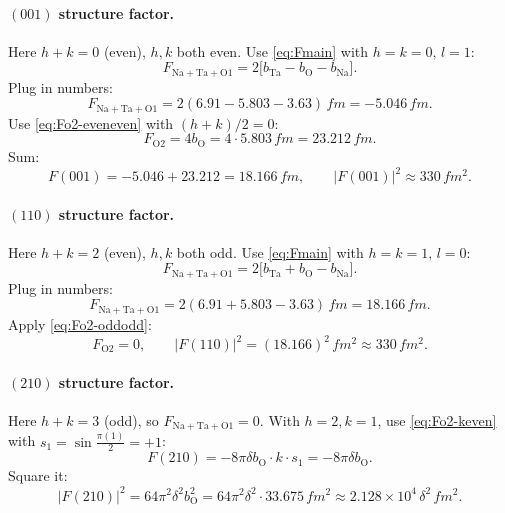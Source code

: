 \documentclass[11pt]{article}
\begin{document}
\paragraph{$(001)$ structure factor.} Here $h+k=0$ (even), $h,k$ both even. Use \eqref{eq:Fmain} with $h=k=0,\,l=1$:
\begin{equation}
F_{\mathrm{Na+Ta+O1}}=2\bigl[b_{\mathrm{Ta}}-b_{\mathrm{O}}-b_{\mathrm{Na}}\bigr].
\end{equation}
Plug in numbers:
\begin{equation}
F_{\mathrm{Na+Ta+O1}}=2(6.91-5.803-3.63)\,\si{fm}=-5.046\,\si{fm}.
\end{equation}
Use \eqref{eq:Fo2-eveneven} with $(h+k)/2=0$:
\begin{equation}
F_{\mathrm{O2}}=4b_{\mathrm{O}}=4\cdot 5.803\,\si{fm}=23.212\,\si{fm}.
\end{equation}
Sum:
\begin{equation}
F(001)=-5.046+23.212=18.166\,\si{fm},\qquad |F(001)|^{2}\approx 330\,\si{fm^2}.
\end{equation}

\paragraph{$(110)$ structure factor.} Here $h+k=2$ (even), $h,k$ both odd. Use \eqref{eq:Fmain} with $h=k=1,\,l=0$:
\begin{equation}
F_{\mathrm{Na+Ta+O1}}=2\bigl[b_{\mathrm{Ta}}+b_{\mathrm{O}}-b_{\mathrm{Na}}\bigr].
\end{equation}
Plug in numbers:
\begin{equation}
F_{\mathrm{Na+Ta+O1}}=2(6.91+5.803-3.63)\,\si{fm}=18.166\,\si{fm}.
\end{equation}
Apply \eqref{eq:Fo2-oddodd}:
\begin{equation}
F_{\mathrm{O2}}=0,\qquad |F(110)|^{2}=(18.166)^{2}\,\si{fm^2}\approx 330\,\si{fm^2}.
\end{equation}

\paragraph{$(210)$ structure factor.} Here $h+k=3$ (odd), so $F_{\mathrm{Na+Ta+O1}}=0$. With $h=2,k=1$, use \eqref{eq:Fo2-keven} with $s_1=\sin\tfrac{\pi(1)}{2}=+1$:
\begin{equation}
F(210)=-8\pi\delta b_{\mathrm{O}}\cdot k\cdot s_1=-8\pi\delta b_{\mathrm{O}}.
\end{equation}
Square it:
\begin{equation}
|F(210)|^{2}=64\pi^{2}\delta^{2}b_{\mathrm{O}}^{2}=64\pi^{2}\delta^{2}\cdot 33.675\,\si{fm^2}\approx 2.128\times 10^{4}\,\delta^{2}\,\si{fm^2}.
\end{equation}
\end{document}
